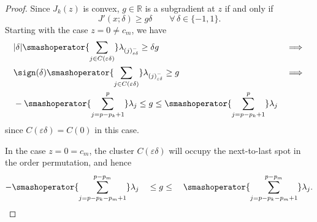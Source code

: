 \begin{proof}
  Since \(J_k(z)\) is convex, \(g \in \mathbb{R}\) is a
  subgradient at \(z\) if and only if~\cite[Theorem 23.2]{rockafellar1970}
  \begin{equation}
    \label{eq:subgrad-ineq}
    J'(x; \delta) \geq g\delta \qquad \forall\,\delta \in \{-1, 1\}.
  \end{equation}
  Starting with the case \(z = 0 \neq c_m\), we have
  \[
    \begin{aligned}
       & |\delta| \smashoperator{\sum_{j \in C(\varepsilon\delta)}} \lambda_{(j)^-_{\varepsilon\delta}} \geq \delta g     & \implies \\
       & \sign(\delta) \smashoperator{\sum_{j \in C(\varepsilon\delta)}} \lambda_{(j)^-_{\varepsilon\delta}} \geq g       & \implies \\
       & -\smashoperator{\sum_{j = p - p_k + 1}^p} \lambda_j \leq g \leq \smashoperator{\sum_{j=p - p_k + 1}^p} \lambda_j
    \end{aligned}
  \]
  since \(C(\varepsilon\delta) = C(0)\) in this case.

  In the case \(z = 0 = c_m\), the cluster \(C(\varepsilon\delta)\) will occupy the
  next-to-last spot in the order permutation, and hence
  \[
    -\smashoperator{\sum_{j = p - p_k - p_m + 1}^{p - p_m}} \lambda_j
    \quad \leq g \leq \quad
    \smashoperator{\sum_{j=p - p_k - p_m + 1}^{p - p_m}} \lambda_j.
  \]


\end{proof}
